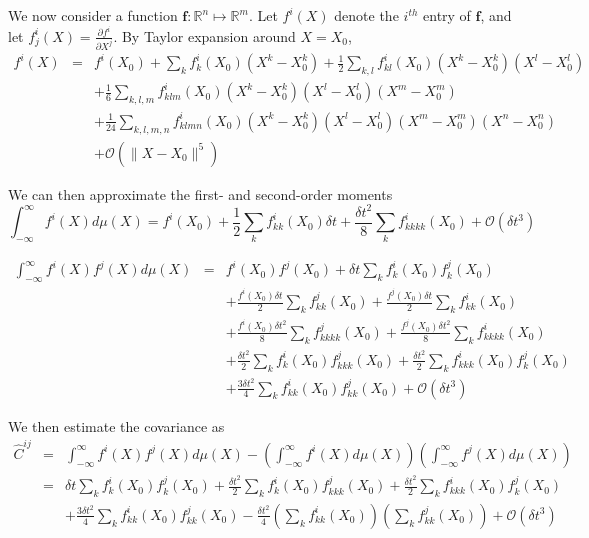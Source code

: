 \documentclass[12pt]{article}
\begin{document}
We now consider a function $\mathbf{f}: \mathbb{R}^n \mapsto \mathbb{R}^m$.
%
Let $f^i(X)$ denote the $i^{th}$ entry of $\mathbf{f}$, and let $f^i_j(X) = \frac{\partial f^i}{\partial X^j}$.
%
By Taylor expansion around $X=X_0$,
\begin{eqnarray}
f^i(X) &=& 
f^i(X_0) 
+ \sum_k f^i_k(X_0)  (X^k-X^k_0) 
+\frac{1}{2} \sum_{k,l}  f^i_{kl} (X_0) (X^k-X_0^k) (X^l-X_0^l) \\
&& + \frac{1}{6} \sum_{k,l,m} f^i_{klm} (X_0) (X^k-X_0^k) (X^l-X_0^l) (X^m-X_0^m) \\
&& + \frac{1}{24} \sum_{k,l,m,n} f^i_{klmn} (X_0) (X^k-X_0^k) (X^l-X_0^l) (X^m-X_0^m) (X^n-X_0^n) \\
&&+ \mathcal{O}\left( \| X- X_0 \|^5 \right)
\end{eqnarray}

We can then approximate the first- and second-order moments 
\begin{equation}
\int_{-\infty}^{\infty} f^i(X) d\mu(X) = 
f^i(X_0) 
+ \frac{1}{2} \sum_k f^i_{kk}(X_0) \delta t 
+ \frac{\delta t^2}{8} \sum_{k} f^i_{kkkk} (X_0) 
+ \mathcal{O} (\delta t^3 )
\end{equation}

\begin{eqnarray}
\int_{-\infty}^{\infty} f^i(X) f^j(X) d\mu(X) 
&= &
f^i(X_0) f^j(X_0) 
+ \delta t \sum_k f^i_k(X_0)  f^j_k(X_0) \\
&&  + \frac{f^i(X_0) \delta t}{2} \sum_{k} f^j_{kk}(X_0)
+ \frac{f^j(X_0) \delta t}{2} \sum_{k} f^i_{kk}(X_0)  \\
&&+ \frac{f^i(X_0) \delta t^2}{8} \sum_{k} f^j_{kkkk} (X_0) 
+ \frac{f^j(X_0) \delta t^2}{8} \sum_{k} f^i_{kkkk} (X_0)\\
&& + \frac{\delta t^2}{2} \sum_k f^i_k(X_0) f^j_{kkk} (X_0)  
+ \frac{\delta t^2}{2} \sum_k f^i_{kkk} (X_0)  f^j_k(X_0) \\
&&+  \frac{3  \delta t^2}{4} \sum_{k} f^i_{kk}(X_0) f^j_{kk}(X_0) 
+ \mathcal{O}\left( \delta t^3 \right) 
\end{eqnarray}

We then estimate the covariance as
\begin{eqnarray}
\hat{C}^{ij} &=& 
\int_{-\infty}^{\infty} f^i(X) f^j(X) d\mu(X) - \left(\int_{-\infty}^{\infty} f^i(X) d\mu(X) \right) \left(\int_{-\infty}^{\infty} f^j(X) d\mu(X) \right) \\
&=&
\delta t \sum_k f^i_k(X_0)  f^j_k(X_0) 
+ \frac{\delta t^2}{2} \sum_k f^i_k(X_0) f^j_{kkk} (X_0)  
 + \frac{\delta t^2}{2} \sum_k f^i_{kkk} (X_0) f^j_k(X_0) \\
&&+  \frac{3 \delta t^2}{4} \sum_{k} f^i_{kk}(X_0) f^j_{kk}(X_0) 
- \frac{\delta t^2}{4} \left( \sum_k f^i_{kk}(X_0) \right) \left( \sum_k f^j_{kk}(X_0) \right) 
 + \mathcal{O}\left( \delta t^3 \right) \\
\end{eqnarray}
\end{document}
